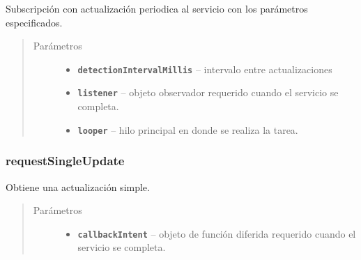\begin{fulllineitems}
    \label{org/hardroid/api/ActivityRecognitionApi:org.hardroid.api.ActivityRecognitionApi.requestActivityUpdates(long, ActivityRecognitionListener, Looper)}\par
Subscripción con actualización periodica al servicio con los parámetros especificados.
\begin{quote}\begin{description}
\item[{Parámetros}] \leavevmode\begin{itemize}
\item {} 
\textbf{\texttt{detectionIntervalMillis}} -- intervalo entre actualizaciones

\item {} 
\textbf{\texttt{listener}} -- objeto observador requerido cuando el servicio se completa. 

\item {} 
\textbf{\texttt{looper}} -- hilo principal en donde se realiza la tarea.

\end{itemize}

\end{description}\end{quote}

\end{fulllineitems}


\subsubsection{requestSingleUpdate}
\label{org/hardroid/api/ActivityRecognitionApi:requestsingleupdate}

\begin{fulllineitems}
    \label{org/hardroid/api/ActivityRecognitionApi:org.hardroid.api.ActivityRecognitionApi.requestSingleUpdate(PendingIntent)}\par
Obtiene una actualización simple.
\begin{quote}\begin{description}
\item[{Parámetros}] \leavevmode\begin{itemize}
\item {} 
\textbf{\texttt{callbackIntent}} --  objeto de función diferida requerido cuando el servicio se completa. 

\end{itemize}

\end{description}\end{quote}

\end{fulllineitems}

